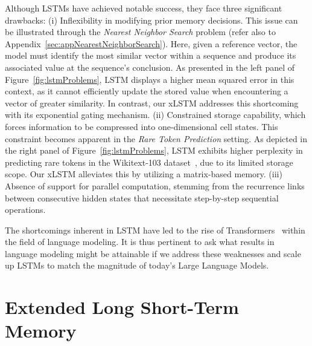 Although LSTMs have achieved notable success, they face three significant drawbacks: (i) Inflexibility in modifying prior memory decisions. This issue can be illustrated through the {\it Nearest Neighbor Search} problem (refer also to Appendix~\ref{sec:appNearestNeighborSearch}). Here, given a reference vector, the model must identify the most similar vector within a sequence and produce its associated value at the sequence's conclusion. As presented in the left panel of Figure~\ref{fig:lstmProblems}, LSTM displays a higher mean squared error in this context, as it cannot efficiently update the stored value when encountering a vector of greater similarity. In contrast, our xLSTM addresses this shortcoming with its exponential gating mechanism. (ii) Constrained storage capability, which forces information to be compressed into one-dimensional cell states. This constraint becomes apparent in the {\it Rare Token Prediction} setting. As depicted in the right panel of Figure~\ref{fig:lstmProblems}, LSTM exhibits higher perplexity in predicting rare tokens in the Wikitext-103 dataset~\citep{Merity:17}, due to its limited storage scope. Our xLSTM alleviates this by utilizing a matrix-based memory. (iii) Absence of support for parallel computation, stemming from the recurrence links between consecutive hidden states that necessitate step-by-step sequential operations.

The shortcomings inherent in LSTM have led to the rise of Transformers~\citep{Vaswani:17} within the field of language modeling. It is thus pertinent to ask what results in language modeling might be attainable if we address these weaknesses and scale up LSTMs to match the magnitude of today’s Large Language Models.

\section{Extended Long Short-Term Memory}
\label{sec:xLSTM}


